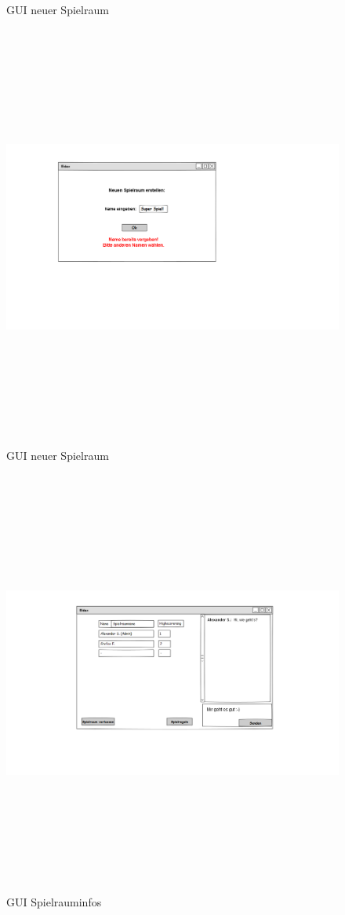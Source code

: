 \begin{center}
\begin{figure}
		\caption{GUI neuer Spielraum}
	\end{figure}
	\begin{figure}
		\includegraphics[width=170mm, height =140mm]{PencilProjectData/neuer_spielraum3}
		\caption{GUI neuer Spielraum}
	\end{figure}
	
	\begin{figure}
		\includegraphics[width=170mm, height =140mm]{PencilProjectData/spielrauminfos1}
		\caption{GUI Spielrauminfos}
	\end{figure}
	

\end{center}
